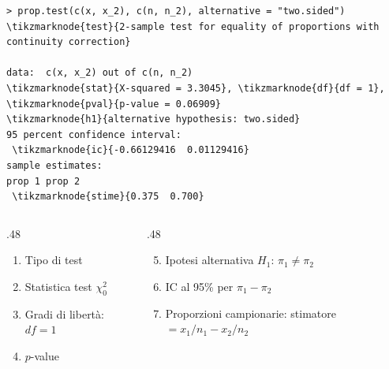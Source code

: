 \documentclass[
  ignorenonframetext,
  compress, aspectratio=149]{beamer}
\begin{document}
\begin{frame}[fragile]{}
\label{section-16}
\begin{Verbatim}[commandchars=\\\{\}, fontsize=\scriptsize, frame=single, framesep=2mm]
> prop.test(c(x, x_2), c(n, n_2), alternative = "two.sided")
\tikzmarknode{test}{2-sample test for equality of proportions with continuity correction}

data:  c(x, x_2) out of c(n, n_2)
\tikzmarknode{stat}{X-squared = 3.3045}, \tikzmarknode{df}{df = 1}, \tikzmarknode{pval}{p-value = 0.06909}
\tikzmarknode{h1}{alternative hypothesis: two.sided}
95 percent confidence interval:
 \tikzmarknode{ic}{-0.66129416  0.01129416}
sample estimates:
prop 1 prop 2
 \tikzmarknode{stime}{0.375  0.700}
\end{Verbatim}

\vspace{-3mm}
\begin{columns}[T]
\begin{column}{.48\textwidth}
\footnotesize
\begin{enumerate}
  \item Tipo di test
  \item Statistica test $\chi^2_0$
  \item Gradi di libertà: $df = 1$
  \item $p$-value
\end{enumerate}
\end{column}
\begin{column}{.48\textwidth}
\footnotesize
\begin{enumerate}
  \setcounter{enumi}{4}
  \item Ipotesi alternativa $H_1$: $\pi_1 \neq \pi_2$
  \item IC al 95\% per $\pi_1 - \pi_2$
  \item Proporzioni campionarie: stimatore $= x_1/n_1 - x_2/n_2$
\end{enumerate}
\end{column}
\end{columns}
\end{frame}
\end{document}
